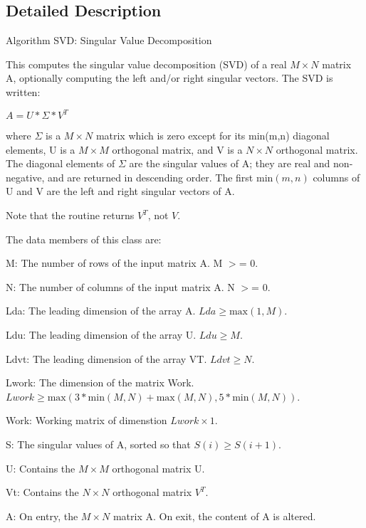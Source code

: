 \subsection{Detailed Description}
Algorithm S\-V\-D\-: Singular Value Decomposition

This computes the singular value decomposition (S\-V\-D) of a real $ M \times N $ matrix A, optionally computing the left and/or right singular vectors. The S\-V\-D is written\-:

$ A = U * \Sigma * V^{T} $

where $ \Sigma $ is a $ M \times N $ matrix which is zero except for its min(m,n) diagonal elements, U is a $ M \times M $ orthogonal matrix, and V is a $ N \times N $ orthogonal matrix. The diagonal elements of $ \Sigma $ are the singular values of A; they are real and non-\/negative, and are returned in descending order. The first $ \mbox{min}(m,n) $ columns of U and V are the left and right singular vectors of A.

Note that the routine returns $ V^{T} $, not $ V $.

The data members of this class are\-:


\begin{DoxyItemize}
\item M\-: The number of rows of the input matrix A. M $>$= 0.
\item N\-: The number of columns of the input matrix A. N $>$= 0.
\item Lda\-: The leading dimension of the array A. $ Lda \geq \mbox{max}(1,M) $.
\item Ldu\-: The leading dimension of the array U. $ Ldu \geq M $.
\item Ldvt\-: The leading dimension of the array V\-T. $ Ldvt \geq N $.
\item Lwork\-: The dimension of the matrix Work. $ Lwork \geq \mbox{max}(3 * \mbox{min}(M,N) + \mbox{max}(M,N), 5 * \mbox{min}(M,N)) $.
\item Work\-: Working matrix of dimenstion $ Lwork \times 1 $.
\item S\-: The singular values of A, sorted so that $ S(i) \geq S(i+1) $.
\item U\-: Contains the $ M \times M $ orthogonal matrix U.
\item Vt\-: Contains the $ N \times N $ orthogonal matrix $ V^{T} $.
\item A\-: On entry, the $ M \times N $ matrix A. On exit, the content of A is altered.
\end{DoxyItemize}

